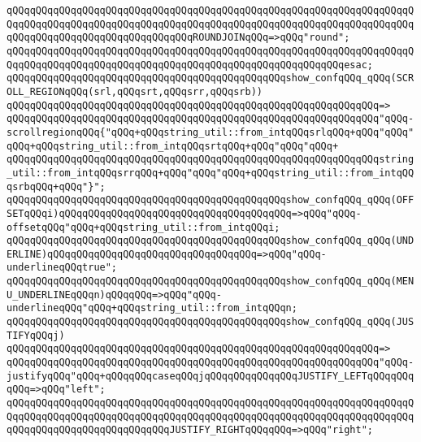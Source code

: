 \verb|qQQqqQQqqQQqqQQqqQQqqQQqqQQqqQQqqQQqqQQqqQQqqQQqqQQqqQQqqQQqqQQqqQQqqQQqqQQqqQQqqQQqqQQqqQQqqQQqqQQqqQQqqQQqqQQqqQQqqQQqqQQqqQQqqQQqqQQqqQQqqQQqqQQqqQQqqQQqqQQqqQQqqQQqqQQqROUNDJOINqQQq=>qQQq"round";|\newline
\verb|qQQqqQQqqQQqqQQqqQQqqQQqqQQqqQQqqQQqqQQqqQQqqQQqqQQqqQQqqQQqqQQqqQQqqQQqqQQqqQQqqQQqqQQqqQQqqQQqqQQqqQQqqQQqqQQqqQQqqQQqqQQqqQQqesac;|\newline
\newline
\verb|qQQqqQQqqQQqqQQqqQQqqQQqqQQqqQQqqQQqqQQqqQQqqQQqshow_confqQQq_qQQq(SCROLL_REGIONqQQq(srl,qQQqsrt,qQQqsrr,qQQqsrb))|\newline
\verb|qQQqqQQqqQQqqQQqqQQqqQQqqQQqqQQqqQQqqQQqqQQqqQQqqQQqqQQqqQQqqQQq=>|\newline
\verb|qQQqqQQqqQQqqQQqqQQqqQQqqQQqqQQqqQQqqQQqqQQqqQQqqQQqqQQqqQQqqQQq"qQQq-scrollregionqQQq{"qQQq+qQQqstring_util::from_intqQQqsrlqQQq+qQQq"qQQq"qQQq+qQQqstring_util::from_intqQQqsrtqQQq+qQQq"qQQq"qQQq+|\newline
\verb|qQQqqQQqqQQqqQQqqQQqqQQqqQQqqQQqqQQqqQQqqQQqqQQqqQQqqQQqqQQqqQQqstring_util::from_intqQQqsrrqQQq+qQQq"qQQq"qQQq+qQQqstring_util::from_intqQQqsrbqQQq+qQQq"}";|\newline
\newline
\verb|qQQqqQQqqQQqqQQqqQQqqQQqqQQqqQQqqQQqqQQqqQQqqQQqshow_confqQQq_qQQq(OFFSETqQQqi)qQQqqQQqqQQqqQQqqQQqqQQqqQQqqQQqqQQqqQQq=>qQQq"qQQq-offsetqQQq"qQQq+qQQqstring_util::from_intqQQqi;|\newline
\verb|qQQqqQQqqQQqqQQqqQQqqQQqqQQqqQQqqQQqqQQqqQQqqQQqshow_confqQQq_qQQq(UNDERLINE)qQQqqQQqqQQqqQQqqQQqqQQqqQQqqQQqqQQq=>qQQq"qQQq-underlineqQQqtrue";|\newline
\verb|qQQqqQQqqQQqqQQqqQQqqQQqqQQqqQQqqQQqqQQqqQQqqQQqshow_confqQQq_qQQq(MENU_UNDERLINEqQQqn)qQQqqQQq=>qQQq"qQQq-underlineqQQq"qQQq+qQQqstring_util::from_intqQQqn;|\newline
\verb|qQQqqQQqqQQqqQQqqQQqqQQqqQQqqQQqqQQqqQQqqQQqqQQqshow_confqQQq_qQQq(JUSTIFYqQQqj)|\newline
\verb|qQQqqQQqqQQqqQQqqQQqqQQqqQQqqQQqqQQqqQQqqQQqqQQqqQQqqQQqqQQqqQQq=>|\newline
\verb|qQQqqQQqqQQqqQQqqQQqqQQqqQQqqQQqqQQqqQQqqQQqqQQqqQQqqQQqqQQqqQQq"qQQq-justifyqQQq"qQQq+qQQqqQQqcaseqQQqjqQQqqQQqqQQqqQQqJUSTIFY_LEFTqQQqqQQqqQQq=>qQQq"left";|\newline
\verb|qQQqqQQqqQQqqQQqqQQqqQQqqQQqqQQqqQQqqQQqqQQqqQQqqQQqqQQqqQQqqQQqqQQqqQQqqQQqqQQqqQQqqQQqqQQqqQQqqQQqqQQqqQQqqQQqqQQqqQQqqQQqqQQqqQQqqQQqqQQqqQQqqQQqqQQqqQQqqQQqqQQqqQQqJUSTIFY_RIGHTqQQqqQQq=>qQQq"right";|\newline
